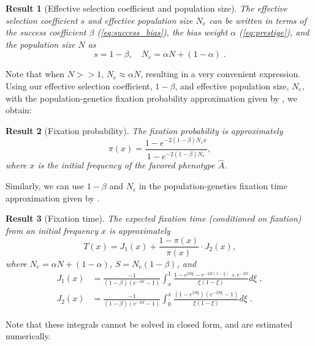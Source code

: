 \documentclass[12pt]{extarticle}
\newtheorem{result}{Result}
\begin{document}
\begin{result}[Effective selection coefficient and population size]\label{res:selection_coef}
The effective selection coefficient $s$ and effective population size $N_e$ can be written in terms of the success coefficient $\beta$ (\cref{eq:success_bias}), the bias weight $\alpha$ (\cref{eq:prestige}), and the population size $N$ as 
\begin{equation}
s=1-\beta, \quad N_e=\alpha N + (1-\alpha) \;.
\end{equation}
\end{result}

Note that when $N>>1$, $N_e \approx \alpha N$, resulting in a very convenient expression.\\

Using our effective selection coefficient, $1-\beta$, and effective population size, $N_e$, with the population-genetics fixation probability approximation given by \citep[eq.~8]{kimura}, we {obtain}:
\begin{result}[Fixation probability]
The fixation probability is approximately
\begin{equation}\label{eq:kimura_p}
\pi(x) = \frac{1-e^{-2(1-\beta)N_e x}}{1-e^{-2(1-\beta)N_e}},
\end{equation}
where $x$ is the initial frequency of the favored phenotype $\hat{A}$.
\end{result}

Similarly, we can use $1-\beta$ and $N_e$ in the population-genetics fixation time approximation given by \citep[eq.~17]{kimura_average}.\\

\begin{result}[Fixation time] The expected fixation time (conditioned on fixation) from an initial frequency $x$ is approximately
\begin{equation} \label{eq:kimura_t}
T(x) = J_1(x) + \frac{1-\pi(x)}{\pi(x)}\cdot J_2(x),
\end{equation}
where $N_e=\alpha N + (1-\alpha)$, $S=N_e(1-\beta)$, and
\begin{equation}
\begin{aligned}
J_1(x) &= \frac{-1}{(1-\beta)(e^{-2S}-1)}\int_x^1 \frac{1-e^{2S\xi}-e^{-2S(1-\xi)}+e^{-2S}}{\xi(1-\xi)}d\xi \;, \\
J_2(x) &= \frac{-1}{(1-\beta)(e^{-2S}-1)}\int_0^x \frac{(1-e^{2S\xi})(e^{-2S\xi}-1)}{\xi(1-\xi)}d\xi \;.
\end{aligned}
\end{equation}
\end{result}
Note that these integrals cannot be solved in closed form, {and are estimated} numerically.
\end{document}
